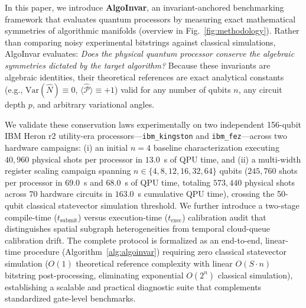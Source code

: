 \documentclass[aps,pra,reprint,superscriptaddress,floatfix,nofootinbib]{revtex4-2}
\begin{document}
In this paper, we introduce \textbf{AlgoInvar}, an invariant-anchored benchmarking framework that evaluates quantum processors by measuring exact mathematical symmetries of algorithmic manifolds (overview in Fig.~\ref{fig:methodology}). Rather than comparing noisy experimental bitstrings against classical simulations, AlgoInvar evaluates: \emph{Does the physical quantum processor conserve the algebraic symmetries dictated by the target algorithm?} Because these invariants are algebraic identities, their theoretical references are exact analytical constants (e.g., $\text{Var}(\hat{N}) \equiv 0$, $\langle \hat{\mathcal{P}} \rangle \equiv +1$) valid for any number of qubits $n$, any circuit depth $p$, and arbitrary variational angles.

We validate these conservation laws experimentally on two independent 156-qubit IBM Heron r2 utility-era processors---\texttt{ibm\_kingston} and \texttt{ibm\_fez}---across two hardware campaigns: (i) an initial $n = 4$ baseline characterization executing $40,960$ physical shots per processor in $13.0$~s of QPU time, and (ii) a multi-width register scaling campaign spanning $n \in \{4, 8, 12, 16, 32, 64\}$ qubits ($245,760$ shots per processor in $69.0$~s and $68.0$~s of QPU time, totaling $573,440$ physical shots across $70$ hardware circuits in $163.0$~s cumulative QPU time), crossing the 50-qubit classical statevector simulation threshold. We further introduce a two-stage compile-time ($t_{\text{submit}}$) versus execution-time ($t_{\text{exec}}$) calibration audit that distinguishes spatial subgraph heterogeneities from temporal cloud-queue calibration drift. The complete protocol is formalized as an end-to-end, linear-time procedure (Algorithm~\ref{alg:algoinvar}) requiring zero classical statevector simulation ($O(1)$ theoretical reference complexity with linear $O(S \cdot n)$ bitstring post-processing, eliminating exponential $O(2^n)$ classical simulation), establishing a scalable and practical diagnostic suite that complements standardized gate-level benchmarks.
\end{document}
